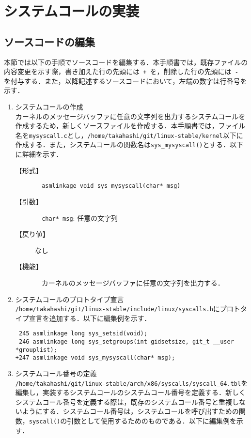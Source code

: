 \documentclass[12pt]{jsarticle}
\begin{document}
\newpage
\section{システムコールの実装}
\label{sec:overview}
\subsection{ソースコードの編集}
本節では以下の手順でソースコードを編集する．本手順書では，既存ファイルの内容変更を示す際，書き加えた行の先頭には\verb| + |を，削除した行の先頭には\verb| - |を付与する．また，以降記述するソースコードにおいて，左端の数字は行番号を示す．

\begin{enumerate}
\item システムコールの作成\\
  カーネルのメッセージバッファに任意の文字列を出力するシステムコールを作成するため，新しくソースファイルを作成する．本手順書では，ファイル名を\verb|mysyscall.c|とし，\verb|/home/takahashi/git/linux-stable/kernel|以下に作成する．また，システムコールの関数名は\verb|sys_mysyscall()|とする．以下に詳細を示す．
  \begin{description}
  \item[【形式】] \verb|  asmlinkage void sys_mysyscall(char* msg)|
  \item[【引数】] \verb|  char* msg|: 任意の文字列
  \item[【戻り値】] なし
  \item[【機能】] 　カーネルのメッセージバッファに任意の文字列を出力する．
  \end{description}

\item システムコールのプロトタイプ宣言\\
  \verb|/home/takahashi/git/linux-stable/include/linux/syscalls.h|にプロトタイプ宣言を追加する．以下に編集例を示す．

\begin{verbatim}
 245 asmlinkage long sys_setsid(void);
 246 asmlinkage long sys_setgroups(int gidsetsize, git_t __user *grouplist);
+247 asmlinkage void sys_mysyscall(char* msg);
\end{verbatim}

\item システムコール番号の定義\\
  \verb|/home/takahashi/git/linux-stable/arch/x86/syscalls/syscall_64.tbl|を編集し，実装するシステムコールのシステムコール番号を定義する．新しくシステムコール番号を定義する際は，既存のシステムコール番号と重複しないようにする．システムコール番号は，システムコールを呼び出すための関数，\verb|syscall()|の引数として使用するためのものである．以下に編集例を示す．


\end{enumerate}
\end{document}

